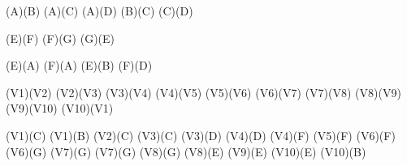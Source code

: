 	
	
	
	
	
	
	
	\Edge(A)(B)
	\Edge(A)(C)
	\Edge(A)(D)
	\Edge(B)(C)
	\Edge(C)(D)
	
	\Edge(E)(F)
	\Edge(F)(G)
	\Edge(G)(E)
	
	\Edge(E)(A)
	\Edge(F)(A)	
	\Edge(E)(B)
	\Edge(F)(D)
	
	
	\Edge(V1)(V2)
	\Edge(V2)(V3)
	\Edge(V3)(V4)
	\Edge(V4)(V5)
	\Edge(V5)(V6)
	\Edge(V6)(V7)
	\Edge(V7)(V8)
	\Edge(V8)(V9)
	\Edge(V9)(V10)
	\Edge(V10)(V1)
	
	\Edge(V1)(C)
	\Edge(V1)(B)
	\Edge(V2)(C)
	\Edge(V3)(C)
	\Edge(V3)(D)
	\Edge(V4)(D)
	\Edge(V4)(F)
	\Edge(V5)(F)
	\Edge(V6)(F)
	\Edge(V6)(G)
	\Edge(V7)(G)
	\Edge(V7)(G)
	\Edge(V8)(G)
	\Edge(V8)(E)
	\Edge(V9)(E)
	\Edge(V10)(E)
	\Edge(V10)(B)
